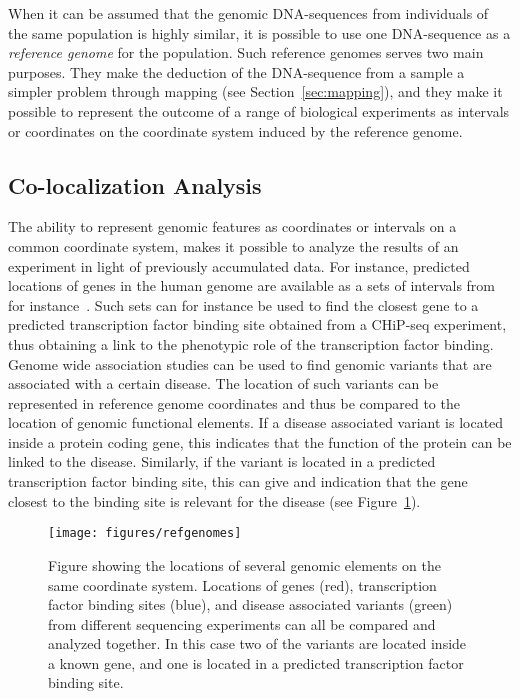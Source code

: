 When it can be assumed that the genomic DNA-sequences from individuals of the same population is highly similar, it is possible to use one DNA-sequence as a \emph{reference genome} for the population.
Such reference genomes serves two main purposes. They make the deduction of the DNA-sequence from a sample a simpler problem through mapping (see Section~\ref{sec:mapping}), and they make it possible to represent the outcome of a range of biological experiments as intervals or coordinates on the coordinate system induced by the reference genome. 

\subsection{Co-localization Analysis}
The ability to represent genomic features as coordinates or intervals on a common coordinate system, makes it possible to analyze the results of an experiment in light of previously accumulated data.
For instance, predicted locations of genes in the human genome are available as a sets of intervals from for instance~\cite{genelist}.
Such sets can for instance be used to find the closest gene to a predicted transcription factor binding site obtained from a CHiP-seq experiment, thus obtaining a link to the phenotypic role of the transcription factor binding.
Genome wide association studies can be used to find genomic variants that are associated with a certain disease.
The location of such variants can be represented in reference genome coordinates and thus be compared to the location of genomic functional elements.
If a disease associated variant is located inside a protein coding gene, this indicates that the function of the protein can be linked to the disease.
Similarly, if the variant is located in a predicted transcription factor binding site, this can give and indication that the gene closest to the binding site is relevant for the disease (see Figure~\ref{fig:refpos}).
\begin{figure}
  \texttt{[image: figures/refgenomes]}
  \label{fig:refpos}
  \caption{Figure showing the locations of several genomic elements on the same coordinate system.
    Locations of genes (red), transcription factor binding sites (blue), and disease associated variants (green) from different sequencing experiments can all be compared and analyzed together.
    In this case two of the variants are located inside a known gene, and one is located in a predicted transcription factor binding site.
}
\end{figure}

